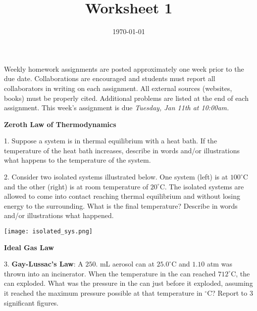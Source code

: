 \documentclass[11pt]{article}
\title{\textbf{Worksheet 1}}
\date{\vspace{-2em}\today}
\begin{document}
\maketitle

Weekly homework assignments are posted approximately one week prior to the
due date. Collaborations are encouraged and students must report all collaborators
in writing on each assignment. All external sources (websites, books) must be
properly cited. Additional problems are listed at the end of each assignment.
This week's assignment is due \textit{Tuesday, Jan 11th at 10:00am.}

\textbf{Zeroth Law of Thermodynamics}

1. Suppose a system is in thermal equilibrium with a heat bath. If the temperature
of the heat bath increases, describe in words and/or illustrations what happens to
the temperature of the system.

% 

\vspace{2in}

2. Consider two isolated systems illustrated below. One system (left) is at $100^\circ\text{C}$
and the other (right) is at room temperature of $20^\circ\text{C}$. The isolated systems are allowed
to come into contact reaching thermal equilibrium and without losing energy to the surrounding.
What is the final temperature? Describe in words and/or illustrations what happened.

\begin{center}
  \texttt{[image: isolated\_sys.png]}
\end{center}


\vspace{2.5in}

\textbf{Ideal Gas Law}

3. \textbf{Gay-Lussac's Law}: A $250.$ mL aerosol can at $25.0^\circ\text{C}$ and $1.10$ atm was
thrown into an incinerator. When the temperature in the can reached $712^\circ\text{C}$, the
can exploded. What was the pressure in the can just before it exploded, assuming it reached
the maximum pressure possible at that temperature in $^\circ\text{C}$? Report to 3 significant figures.
\end{document}
